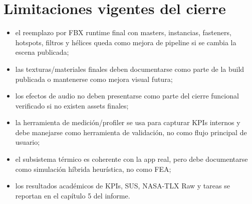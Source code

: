 \documentclass[12pt,letterpaper]{article}
\begin{document}
\section{Limitaciones vigentes del cierre}
\begin{itemize}
    \item el reemplazo por FBX runtime final con masters, instancias, fasteners, hotspots, filtros y hélices queda como mejora de pipeline si se cambia la escena publicada;
    \item las texturas/materiales finales deben documentarse como parte de la build publicada o mantenerse como mejora visual futura;
    \item los efectos de audio no deben presentarse como parte del cierre funcional verificado si no existen assets finales;
    \item la herramienta de medición/profiler se usa para capturar KPIs internos y debe manejarse como herramienta de validación, no como flujo principal de usuario;
    \item el subsistema térmico es coherente con la app real, pero debe documentarse como simulación híbrida heurística, no como FEA;
    \item los resultados académicos de KPIs, SUS, NASA-TLX Raw y tareas se reportan en el capítulo 5 del informe.
\end{itemize}
\end{document}
